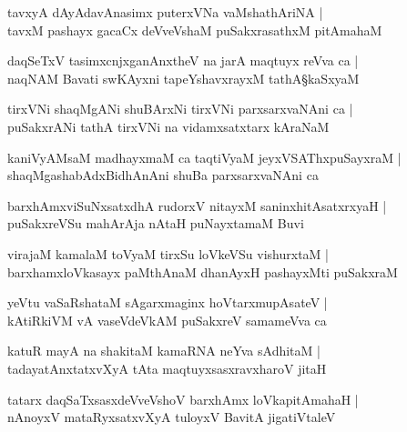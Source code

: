 \begin{shloka}
tavxyA dAyAdavAnasimx puterxVNa vaMshathAriNA |\\
tavxM pashayx gacaCx deVveVshaM puSakxrasathxM pitAmahaM
\end{shloka}

\begin{shloka}
daqSeTxV tasimxcnjxganAnxtheV na jarA maqtuyx reVva ca |\\
naqNAM Bavati swKAyxni tapeYshavxrayxM tathA\S kaSxyaM 
\end{shloka}

\begin{shloka}
tirxVNi shaqMgANi shuBArxNi tirxVNi parxsarxvaNAni ca |\\
puSakxrANi tathA tirxVNi na vidamxsatxtarx kAraNaM
\end{shloka}

\begin{shloka}
kaniVyAMsaM madhayxmaM ca taqtiVyaM jeyxVSAThxpuSayxraM |\\
shaqMgashabAdxBidhAnAni shuBa parxsarxvaNAni ca 
\end{shloka}

\begin{shloka}
barxhAmxviSuNxsatxdhA rudorxV nitayxM saninxhitAsatxrxyaH |\\
puSakxreVSu mahArAja nAtaH puNayxtamaM Buvi
\end{shloka}

\begin{shloka}
virajaM kamalaM toVyaM tirxSu loVkeVSu vishurxtaM |\\
barxhamxloVkasayx paMthAnaM dhanAyxH pashayxMti puSakxraM
\end{shloka}

\begin{shloka}
yeVtu vaSaRshataM sAgarxmaginx hoVtarxmupAsateV |\\
kAtiRkiVM vA vaseVdeVkAM puSakxreV samameVva ca 
\end{shloka}

\begin{shloka}
katuR mayA na shakitaM kamaRNA neYva sAdhitaM |\\
tadayatAnxtatxvXyA tAta maqtuyxsasxravxharoV jitaH 
\end{shloka}

\begin{shloka}
tatarx daqSaTxsasxdeVveVshoV barxhAmx loVkapitAmahaH |\\
nAnoyxV mataRyxsatxvXyA tuloyxV BavitA jigatiVtaleV 
\end{shloka}

